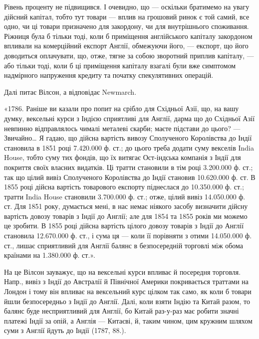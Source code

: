 \parcont{}  %
Рівень проценту не підвищився. І очевидно, що — оскільки братимемо на увагу
дійсний капітал, тобто тут товари — вплив на грошовий ринок є той самий,
все одно, чи ці товари призначено для закордону, чи для внутрішнього споживання.
Ріжниця була б тільки тоді, коли б приміщення англійського капіталу
закордоном впливали на комерційний експорт Англії, обмежуючи його, — експорт,
що його доводиться оплачувати, що, отже, тягне за собою зворотний приплив
капіталу, — або тільки тоді, коли б ці приміщення капіталу взагалі були вже
симптомом надмірного напруження кредиту та початку спекулятивних операцій.

Далі питає Вілсон, а відповідає Newmarch.

«1786. Раніше ви казали про попит на срібло для Східньої Азії, що, на
вашу думку, вексельні курси з Індією сприятливі для Англії, дарма що до Східньої
Азії невпинно відправлялось чималі металеві скарби; маєте підстави до цього? —
Звичайно\dots{} Я гадаю, що дійсна вартість вивозу Сполученого Королівства до
Індії становила в 1851 році 7.420.000 ф. ст.; до цього треба додати суму
векселів India House, тобто суму тих фондів, що їх витягає Ост-індська компанія
з Індії для покриття своїх власних видатків. Ці тратти становили в тім році
3.200.000 ф. ст.; так що цілий вивіз Сполученого Королівства до Індії становив
10.620.000 ф. ст. В 1855 році дійсна вартість товарового експорту піднеслася
до 10.350.000 ф. ст.; тратти India House становили 3.700.000 ф. ст.;
отже, цілий вивіз 14.050.000 ф. ст. Для 1851 року, думається мені, в нас немає
ніякого засобу визначити дійсну вартість довозу товарів з Індії до Англії; але
для 1854 та 1855 років ми можемо це зробити. В 1855 році дійсна вартість
цілого довозу товарів з Індії до Англії становила 12.670.000 ф. ст., і сума ця —
коли її порівняти з отими 14.050.000 ф. ст., лишає сприятливий для Англії
балянс в безпосередній торговлі між обома країнами на 1.380.000 ф. ст.».

На це Вілсон зауважує, що на вексельні курси впливає й посередня торговля.
Напр., вивіз з Індії до Австралії й Північної Америки покривається траттами
на Лондон і тому він впливає на вексельний курс цілком так само, як
коли б товари йшли безпосередньо з Індії до Англії. Далі, коли взяти Індію та
Китай разом, то балянс буде несприятливий для Англії, бо Китай раз-у-раз
має робити значні платежі Індії за опій, а Англія — Китаєві, й, таким чином, цим
кружним шляхом суми з Англії йдуть до Індії (1787, 88.).

